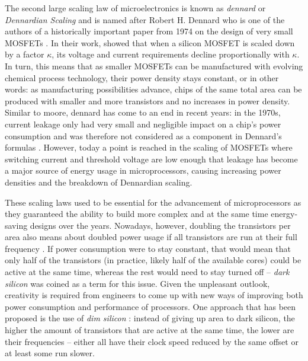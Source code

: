 The second large scaling law of microelectronics is known as \emph{\gls{dennard}} or \emph{Dennardian Scaling} and is named after Robert H. Dennard who is one of the authors of a historically important paper from 1974 on the design of very small \glspl{MOSFET} \cite{dennard1974design}. In their work, \citeauthor{dennard1974design} showed that when a silicon \gls{MOSFET} is scaled down by a factor $\kappa$, its voltage and current requirements decline proportionally with $\kappa$. In turn, this means that as smaller \glspl{MOSFET} can be manufactured with evolving chemical process technology, their power density stays constant, or in other words: as manufacturing possibilities advance, chips of the same total area can be produced with smaller and more transistors and no increases in power density. Similar to \gls{moore}, \gls{dennard} has come to an end in recent years: in the 1970s, current leakage only had very small and negligible impact on a chip's power consumption and was therefore not considered as a component in Dennard's formulas \cite{bohr200730}. However, today a point is reached in the scaling of \glspl{MOSFET} where switching current and threshold voltage are low enough that leakage has become a major source of energy usage in microprocessors, causing increasing power densities and the breakdown of Dennardian scaling.

These scaling laws used to be essential for the advancement of microprocessors as they guaranteed the ability to build more complex and at the same time energy-saving designs over the years. Nowadays, however, doubling the transistors per area also means about doubled power usage if all transistors are run at their full frequency \cite{taylor2012dark}. If power consumption were to stay constant, that would mean that only half of the transistors (in practice, likely half of the available cores) could be active at the same time, whereas the rest would need to stay turned off -- \emph{dark silicon} was coined as a term for this issue. Given the unpleasant outlook, creativity is required from engineers to come up with new ways of improving both power consumption and performance of processors. One approach that has been proposed is the use of \emph{dim silicon} \cite{huang2011scaling}: instead of giving up area to dark silicon, the higher the amount of transistors that are active at the same time, the lower are their frequencies -- either all have their clock speed reduced by the same offset or at least some run slower.

